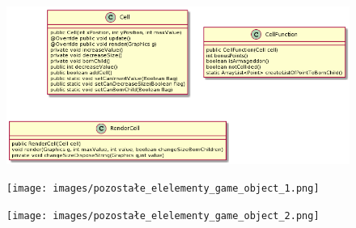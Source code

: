 \documentclass{article}
\begin{document}
\begin{figure} [hbt!]
    \includegraphics[width=15cm,center]{images/pakiet_cell.png}
\end{figure}

\begin{figure} [hbt!]
    \texttt{[image: images/pozostałe\_elelementy\_game\_object\_1.png]}
\end{figure}

\begin{figure} [hbt!]
    \texttt{[image: images/pozostałe\_elelementy\_game\_object\_2.png]}
\end{figure}

\clearpage
\end{document}
